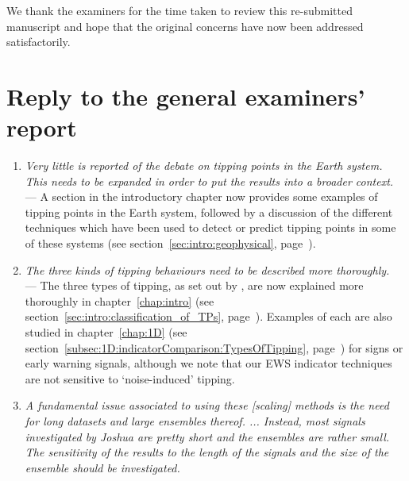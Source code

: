 We thank the examiners for the time taken to review this re-submitted manuscript and hope that the original concerns have now been addressed satisfactorily. 

\section*{Reply to the general examiners' report}
\label{rep:gen}

\begin{enumerate}
	\item \label{rep:gen:debate} \emph{Very little is reported of the debate on tipping points in the Earth system. This needs to be expanded in order to put the results into a broader context.}\\
	— A section in the introductory chapter now provides some examples of tipping points in the Earth system, followed by a discussion of the different techniques which have been used to detect or predict tipping points in some of these systems (see section~\ref{sec:intro:geophysical}, page~\pageref{sec:intro:geophysical}). %
	\item \label{rep:gen:threekinds} \emph{The three kinds of tipping behaviours need to be described more thoroughly.}\\
	— The three types of tipping, as set out by \cite{livina2011,ashwin2012}, are now explained more thoroughly in chapter~\ref{chap:intro} (see section~\ref{sec:intro:classification_of_TPs}, page~\pageref{sec:intro:classification_of_TPs}). Examples of each are also studied in chapter~\ref{chap:1D} (see section~\ref{subsec:1D:indicatorComparison:TypesOfTipping}, page~\pageref{subsec:1D:indicatorComparison:TypesOfTipping}) for signs or early warning signals, although we note that our EWS indicator techniques are not sensitive to `noise-induced' tipping.
	\item \label{rep:gen:longdatasets} \emph{A fundamental issue associated to using these [scaling] methods is the need for long datasets and large ensembles thereof. ... Instead, most signals investigated by Joshua are pretty short and the ensembles are rather small. The sensitivity of the results to the length of the signals and the size of the ensemble should be investigated.}\\

\end{enumerate}

